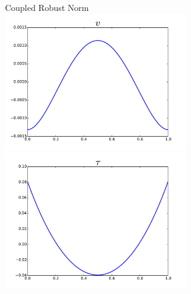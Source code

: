 \documentclass[18pt,xcolor=table]{beamer}
\begin{document}
\begin{frame}[t]
\begin{columns}
\begin{column}{0.5\textwidth}
\begin{figure}[t]
\end{figure}
\end{column}
\begin{column}{0.5\textwidth}
\begin{figure}[t]
\centering
Coupled Robust Norm
\includegraphics[width=0.8\textwidth]{OptimalTestFunctions/uLinear_1e-2/steady/coupledrobust_steady_v.pdf}\\
\includegraphics[width=0.8\textwidth]{OptimalTestFunctions/uLinear_1e-2/steady/coupledrobust_steady_tau.pdf}
\end{figure}
\end{column}
\end{columns}
\end{frame}
\end{document}
